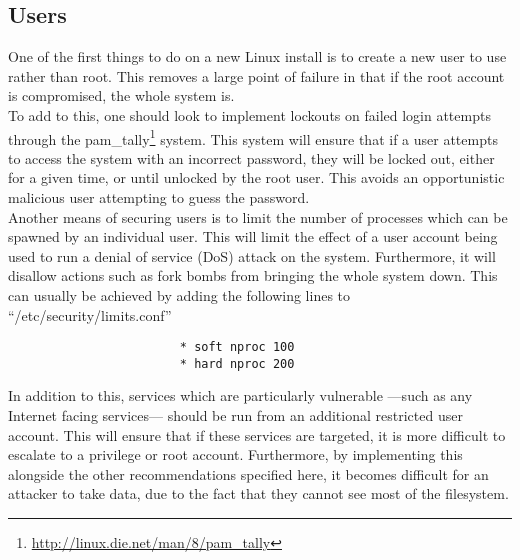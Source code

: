 			\subsection{Users}
				One of the first things to do on a new Linux install is to create a new user to use rather than root.
				This removes a large point of failure in that if the root account is compromised, the whole system is.\\
				To add to this, one should look to implement lockouts on failed login attempts through the pam\_tally\footnote{\url{http://linux.die.net/man/8/pam\_tally}} system.
				This system will ensure that if a user attempts to access the system with an incorrect password, they will be locked out, either for a given time, or until unlocked by the root user.
				This avoids an opportunistic malicious user attempting to guess the password. \\
				Another means of securing users is to limit the number of processes which can be spawned by an individual user.
				This will limit the effect of a user account being used to run a denial of service (DoS) attack on the system.
				Furthermore, it will disallow actions such as fork bombs from bringing the whole system down.
				This can usually be achieved by adding the following lines to ``/etc/security/limits.conf''
				\begin{verbatim}
						* soft nproc 100
						* hard nproc 200
				\end{verbatim}

				In addition to this, services which are particularly vulnerable
				---such as any Internet facing services---
				should be run from an additional restricted user account.
				This will ensure that if these services are targeted, it is more difficult to escalate to a privilege or root account.
				Furthermore, by implementing this alongside the other recommendations specified here,
				it becomes difficult for an attacker to take data, due to the fact that they cannot see most of the filesystem.

